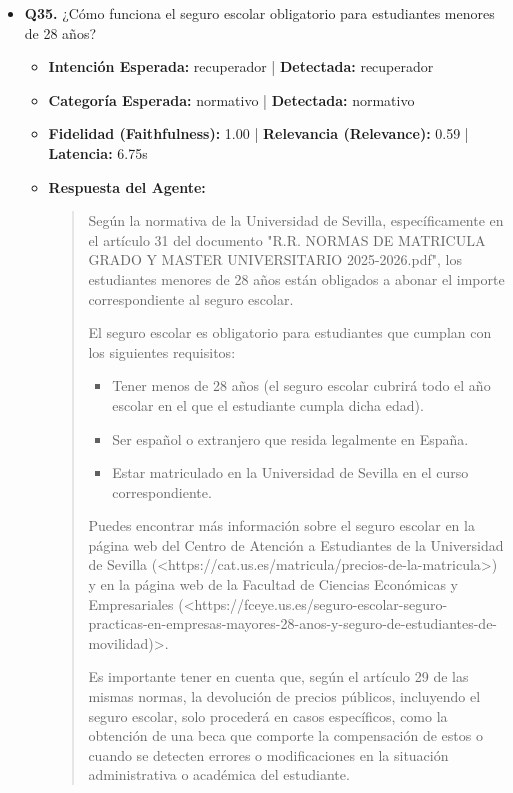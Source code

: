 \documentclass[12pt,a4paper,oneside]{report}
\begin{document}
\begin{itemize}
  
\item \textbf{Q35.} ¿Cómo funciona el seguro escolar obligatorio para estudiantes menores de 28 años? \\
        \begin{itemize}
          \item \textbf{Intención Esperada:} recuperador | \textbf{Detectada:} recuperador
          \item \textbf{Categoría Esperada:} normativo | \textbf{Detectada:} normativo
          \item \textbf{Fidelidad (Faithfulness):} 1.00 | \textbf{Relevancia (Relevance):} 0.59 | \textbf{Latencia:} 6.75s
          \item \textbf{{Respuesta del Agente:}} \\
                \begin{quote}
Según la normativa de la Universidad de Sevilla, específicamente en el artículo 31 del documento "R.R. NORMAS DE MATRICULA GRADO Y MASTER UNIVERSITARIO 2025-2026.pdf", los estudiantes menores de 28 años están obligados a abonar el importe correspondiente al seguro escolar.

El seguro escolar es obligatorio para estudiantes que cumplan con los siguientes requisitos:

\begin{itemize}
  \item Tener menos de 28 años (el seguro escolar cubrirá todo el año escolar en el que el estudiante cumpla dicha edad).
  \item Ser español o extranjero que resida legalmente en España.
  \item Estar matriculado en la Universidad de Sevilla en el curso correspondiente.
\end{itemize}

Puedes encontrar más información sobre el seguro escolar en la página web del Centro de Atención a Estudiantes de la Universidad de Sevilla (<https://cat.us.es/matricula/precios-de-la-matricula>) y en la página web de la Facultad de Ciencias Económicas y Empresariales (<https://fceye.us.es/seguro-escolar-seguro-practicas-en-empresas-mayores-28-anos-y-seguro-de-estudiantes-de-movilidad)>.

Es importante tener en cuenta que, según el artículo 29 de las mismas normas, la devolución de precios públicos, incluyendo el seguro escolar, solo procederá en casos específicos, como la obtención de una beca que comporte la compensación de estos o cuando se detecten errores o modificaciones en la situación administrativa o académica del estudiante.


\end{quote}
\end{itemize}
\end{itemize}
\end{document}
